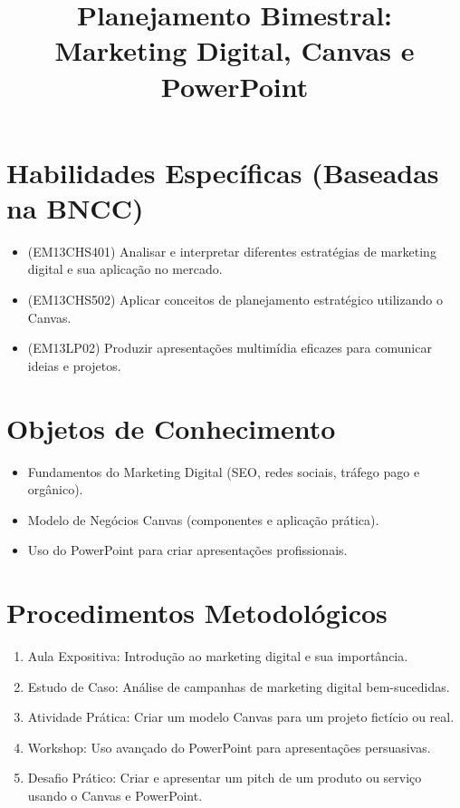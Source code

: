 \documentclass[a4paper,12pt]{article}
\title{Planejamento Bimestral: \\ Marketing Digital, Canvas e PowerPoint}
\author{}
\date{}
\begin{document}
\maketitle

\section*{Habilidades Específicas (Baseadas na BNCC)}
\begin{itemize}
    \item (EM13CHS401) Analisar e interpretar diferentes estratégias de marketing digital e sua aplicação no mercado.
    \item (EM13CHS502) Aplicar conceitos de planejamento estratégico utilizando o Canvas.
    \item (EM13LP02) Produzir apresentações multimídia eficazes para comunicar ideias e projetos.
\end{itemize}

\section*{Objetos de Conhecimento}
\begin{itemize}
    \item Fundamentos do Marketing Digital (SEO, redes sociais, tráfego pago e orgânico).
    \item Modelo de Negócios Canvas (componentes e aplicação prática).
    \item Uso do PowerPoint para criar apresentações profissionais.
\end{itemize}

\section*{Procedimentos Metodológicos}
\begin{enumerate}
    \item Aula Expositiva: Introdução ao marketing digital e sua importância.
    \item Estudo de Caso: Análise de campanhas de marketing digital bem-sucedidas.
    \item Atividade Prática: Criar um modelo Canvas para um projeto fictício ou real.
    \item Workshop: Uso avançado do PowerPoint para apresentações persuasivas.
    \item Desafio Prático: Criar e apresentar um pitch de um produto ou serviço usando o Canvas e PowerPoint.
\end{enumerate}
\end{document}
